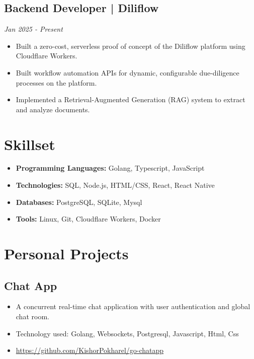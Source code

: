 \documentclass[11pt,a4paper]{article}
\begin{document}
\subsection*{Backend Developer | Diliflow} \hfill \textit{Jan 2025 - Present}
\begin{itemize}[leftmargin=*, noitemsep]
    \item Built a zero-cost, serverless proof of concept of the Diliflow platform using Cloudflare Workers.
    \item Built workflow automation APIs for dynamic, configurable due-diligence processes on the platform.
    \item Implemented a Retrieval-Augmented Generation (RAG) system to extract and analyze documents.
\end{itemize}

\section*{Skillset}
\begin{itemize}[leftmargin=*, noitemsep]
    \item \textbf{Programming Languages:} Golang, Typescript, JavaScript
    \item \textbf{Technologies:} SQL, Node.js, HTML/CSS, React, React Native
    \item \textbf{Databases:} PostgreSQL, SQLite, Mysql
    \item \textbf{Tools:} Linux, Git, Cloudflare Workers, Docker
\end{itemize}

\section*{Personal Projects}

\subsection*{Chat App}
\begin{itemize}[leftmargin=*, noitemsep]
    \item A concurrent real-time chat application with user authentication and global chat room.
    \item Technology used: Golang, Websockets, Postgresql, Javascript, Html, Css
    \item \href{https://github.com/KishorPokharel/go-chatapp}{https://github.com/KishorPokharel/go-chatapp}
\end{itemize}
\end{document}
